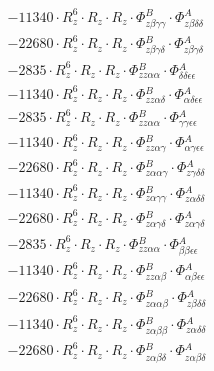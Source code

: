 \documentclass{article}
\begin{document}
\begin{subequations}
\begin{gather}
\begin{array}{c}
 \\[0.2em] 		 - 11340 \cdot R_{z}^{6} \cdot R_{z} \cdot R_{z} \cdot \Phi{}^{B}_{z\beta{}\gamma{}\gamma{}} \cdot \Phi{}^{A}_{z\beta{}\delta{}\delta{}} 
 \\[0.2em] 		 - 22680 \cdot R_{z}^{6} \cdot R_{z} \cdot R_{z} \cdot \Phi{}^{B}_{z\beta{}\gamma{}\delta{}} \cdot \Phi{}^{A}_{z\beta{}\gamma{}\delta{}} 
 \\[0.2em] 		 - 2835 \cdot R_{z}^{6} \cdot R_{z} \cdot R_{z} \cdot \Phi{}^{B}_{zz\alpha{}\alpha{}} \cdot \Phi{}^{A}_{\delta{}\delta{}\epsilon{}\epsilon{}} 
 \\[0.2em] 		 - 11340 \cdot R_{z}^{6} \cdot R_{z} \cdot R_{z} \cdot \Phi{}^{B}_{zz\alpha{}\delta{}} \cdot \Phi{}^{A}_{\alpha{}\delta{}\epsilon{}\epsilon{}} 
 \\[0.2em] 		 - 2835 \cdot R_{z}^{6} \cdot R_{z} \cdot R_{z} \cdot \Phi{}^{B}_{zz\alpha{}\alpha{}} \cdot \Phi{}^{A}_{\gamma{}\gamma{}\epsilon{}\epsilon{}} 
 \\[0.2em] 		 - 11340 \cdot R_{z}^{6} \cdot R_{z} \cdot R_{z} \cdot \Phi{}^{B}_{zz\alpha{}\gamma{}} \cdot \Phi{}^{A}_{\alpha{}\gamma{}\epsilon{}\epsilon{}} 
 \\[0.2em] 		 - 22680 \cdot R_{z}^{6} \cdot R_{z} \cdot R_{z} \cdot \Phi{}^{B}_{z\alpha{}\alpha{}\gamma{}} \cdot \Phi{}^{A}_{z\gamma{}\delta{}\delta{}} 
 \\[0.2em] 		 - 11340 \cdot R_{z}^{6} \cdot R_{z} \cdot R_{z} \cdot \Phi{}^{B}_{z\alpha{}\gamma{}\gamma{}} \cdot \Phi{}^{A}_{z\alpha{}\delta{}\delta{}} 
 \\[0.2em] 		 - 22680 \cdot R_{z}^{6} \cdot R_{z} \cdot R_{z} \cdot \Phi{}^{B}_{z\alpha{}\gamma{}\delta{}} \cdot \Phi{}^{A}_{z\alpha{}\gamma{}\delta{}} 
 \\[0.2em] 		 - 2835 \cdot R_{z}^{6} \cdot R_{z} \cdot R_{z} \cdot \Phi{}^{B}_{zz\alpha{}\alpha{}} \cdot \Phi{}^{A}_{\beta{}\beta{}\epsilon{}\epsilon{}} 
 \\[0.2em] 		 - 11340 \cdot R_{z}^{6} \cdot R_{z} \cdot R_{z} \cdot \Phi{}^{B}_{zz\alpha{}\beta{}} \cdot \Phi{}^{A}_{\alpha{}\beta{}\epsilon{}\epsilon{}} 
 \\[0.2em] 		 - 22680 \cdot R_{z}^{6} \cdot R_{z} \cdot R_{z} \cdot \Phi{}^{B}_{z\alpha{}\alpha{}\beta{}} \cdot \Phi{}^{A}_{z\beta{}\delta{}\delta{}} 
 \\[0.2em] 		 - 11340 \cdot R_{z}^{6} \cdot R_{z} \cdot R_{z} \cdot \Phi{}^{B}_{z\alpha{}\beta{}\beta{}} \cdot \Phi{}^{A}_{z\alpha{}\delta{}\delta{}} 
 \\[0.2em] 		 - 22680 \cdot R_{z}^{6} \cdot R_{z} \cdot R_{z} \cdot \Phi{}^{B}_{z\alpha{}\beta{}\delta{}} \cdot \Phi{}^{A}_{z\alpha{}\beta{}\delta{}} 

\end{array}
\end{gather}
\end{subequations}
\end{document}

